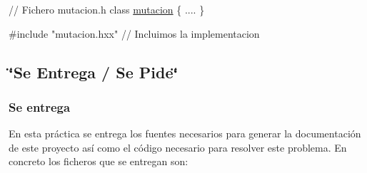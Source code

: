 \begin{DoxyCode}
\textcolor{comment}{// Fichero mutacion.h  }
\textcolor{keyword}{class }\hyperlink{classmutacion}{mutacion} \{
 ....
\}

\textcolor{preprocessor}{#include "mutacion.hxx"} \textcolor{comment}{// Incluimos la implementacion}
\end{DoxyCode}
\hypertarget{index_sec_tar}{}\subsection{\char`\"{}\-Se Entrega / Se Pide\char`\"{}}\label{index_sec_tar}
\hypertarget{index_ssEntrega}{}\subsubsection{Se entrega}\label{index_ssEntrega}
En esta práctica se entrega los fuentes necesarios para generar la documentación de este proyecto así como el código necesario para resolver este problema. En concreto los ficheros que se entregan son\-:

